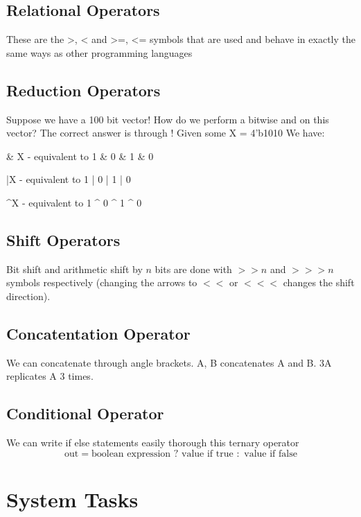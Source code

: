 \section{Relational Operators}
These are the >, < and >=, <= symbols that are used and behave in exactly the same ways as other programming languages

\section{Reduction Operators}
Suppose we have a 100 bit vector! How do we perform a bitwise and on this vector? The correct answer is through ! Given some X = 4'b1010 We have:
\begin{bullets}
	\item \& X - equivalent to 1 \& 0 \& 1 \& 0
	\item |X - equivalent to 1 | 0 | 1 | 0
	\item \textasciicircum{}X - equivalent to 1 \textasciicircum{} 0 \textasciicircum{} 1 \textasciicircum{} 0
\end{bullets}

\section{Shift Operators}

Bit shift and arithmetic shift by $n$ bits are done with $>> n$ and $>>> n$ symbols respectively (changing the arrows to $<<$ or $<<<$ changes the shift direction).

\section{Concatentation Operator}
We can concatenate through angle brackets. {A, B} concatenates A and B. {3{A}} replicates A 3 times.

\section{Conditional Operator}
We can write if else statements easily thorough this ternary operator
\[ \text{out} = \text{boolean expression } ? \text{ value if true } : \text{ value if false} \]

\chapter{System Tasks}

